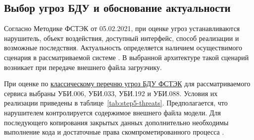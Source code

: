 \documentclass[12pt,a4paper]{report}
\begin{document}
\subsection{Выбор угроз БДУ и обоснование актуальности}

Согласно Методике ФСТЭК от 05.02.2021, при оценке угроз устанавливаются нарушитель, объект воздействия, доступный интерфейс, способ реализации и возможные последствия. Актуальность определяется наличием осуществимого сценария в рассматриваемой системе \cite{fstekmethod}. В выбранной архитектуре такой сценарий возникает при передаче внешнего файла загрузчику.

При оценке по \href{https://bdu.fstec.ru/threat}{классическому перечню угроз БДУ ФСТЭК} для рассматриваемого сервиса выбраны УБИ.006, УБИ.033, УБИ.192 и УБИ.088. Условия их реализации приведены в таблице~\ref{tab:step5-threats}. Предполагается, что нарушителем контролируется содержимое внешнего файла модели. Для последующего копирования закрытых данных дополнительно необходимы выполнение кода и достаточные права скомпрометированного процесса \cite{bduthrlist}.
\end{document}
